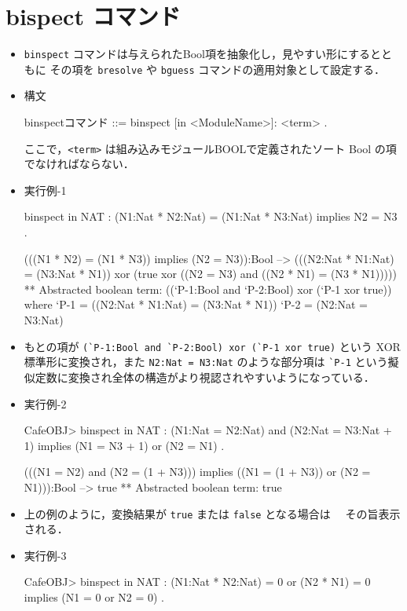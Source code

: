\documentclass[a4paper,oneside,10pt,here]{memoir}
\newenvironment{vvtm}%
{\parskip=0pt\lineskip=0pt\begin{center}\begin{minipage}{0.8\textwidth}\begin{snugshade}}%
  {\end{snugshade}\end{minipage}\end{center}}
\begin{document}
\section{bispect コマンド}
\begin{itemize}
\item \verb|binspect| コマンドは与えられたBool項を抽象化し，見やすい形にするとともに
  その項を \verb|bresolve| や \verb|bguess| コマンドの適用対象として設定する．
\item 構文
  \begin{vvtm}
    \begin{simplev}
    binspectコマンド ::= binspect [in <ModuleName>]: <term> .
    \end{simplev}
  \end{vvtm}
 ここで，\verb|<term>| は組み込みモジュールBOOLで定義されたソート Bool の項でなければならない．
\item 実行例-1
\begin{simplev}
binspect in NAT : (N1:Nat * N2:Nat) = (N1:Nat * N3:Nat) implies N2 = N3 .

(((N1 * N2) = (N1 * N3)) implies (N2 = N3)):Bool
--> (((N2:Nat * N1:Nat) = (N3:Nat * N1)) xor (true xor ((N2 = N3) and ((N2 * N1) = (N3 * N1)))))
** Abstracted boolean term:
  ((`P-1:Bool and `P-2:Bool) xor (`P-1 xor true))
  where
    `P-1 = ((N2:Nat * N1:Nat) = (N3:Nat * N1))
    `P-2 = (N2:Nat = N3:Nat)
\end{simplev}
\item もとの項が \verb|(`P-1:Bool and `P-2:Bool) xor (`P-1 xor true)| という
  XOR 標準形に変換され，また \verb|N2:Nat = N3:Nat| のような部分項は
  \verb|`P-1| という擬似定数に変換され全体の構造がより視認されやすいようになっている．
\item 実行例-2
\begin{simplev}
CafeOBJ> binspect in NAT : (N1:Nat = N2:Nat) and (N2:Nat = N3:Nat + 1) 
           implies (N1 = N3 + 1) or (N2 = N1) .

(((N1 = N2) and (N2 = (1 + N3))) implies ((N1 = (1 + N3)) or (N2 = N1))):Bool
--> true
** Abstracted boolean term:
  true
\end{simplev}
\item 上の例のように，変換結果が \verb|true| または \verb|false| となる場合は
  　その旨表示される．

\item 実行例-3
\begin{simplev}
CafeOBJ> binspect in NAT : (N1:Nat * N2:Nat) = 0 or (N2 * N1) = 0 implies (N1 = 0 or N2 = 0) .


\end{simplev}
\end{itemize}
\end{document}
